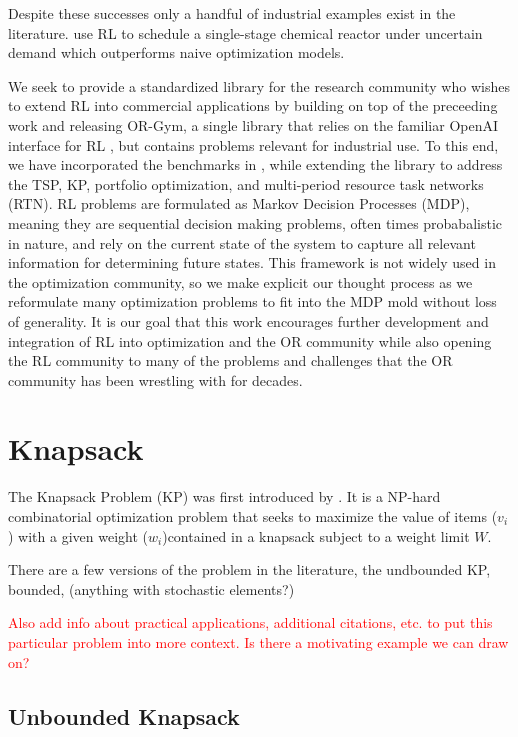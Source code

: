 \documentclass[12pt]{article}
\begin{document}
Despite these successes only a handful of industrial examples exist in the literature. 
\citet{Hubbs2020} use RL to schedule a single-stage chemical reactor under uncertain demand which outperforms naive optimization models. 

We seek to provide a standardized library for the research community who wishes to extend RL into commercial applications by building on top of the preceeding work and releasing OR-Gym, a single library that relies on the familiar OpenAI interface for RL \citep{Brockman2016}, but contains problems relevant for industrial use.
To this end, we have incorporated the benchmarks in \citet{Balaji2019}, while extending the library to address the TSP, KP, portfolio optimization, and multi-period resource task networks (RTN). 
RL problems are formulated as Markov Decision Processes (MDP), meaning they are sequential decision making problems, often times probabalistic in nature, and rely on the current state of the system to capture all relevant information for determining future states. %
This framework is not widely used in the optimization community, so we make explicit our thought process as we reformulate many optimization problems to fit into the MDP mold without loss of generality.
It is our goal that this work encourages further development and integration of RL into optimization and the OR community while also opening the RL community to many of the problems and challenges that the OR community has been wrestling with for decades.

\section{Knapsack}

The Knapsack Problem (KP) was first introduced by \citet{Matthews1896}. 
It is a NP-hard combinatorial optimization problem that seeks to maximize the value of items ($v_i$) with a given weight ($w_i$)contained in a knapsack subject to a weight limit $W$. 

There are a few versions of the problem in the literature, the undbounded KP, bounded, (anything with stochastic elements?)

\textcolor{red}{Also add info about practical applications, additional citations, etc. to put this particular problem into more context. Is there a motivating example we can draw on?}

\subsection{Unbounded Knapsack}
\end{document}
